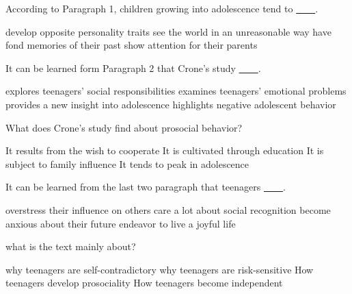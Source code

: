 \item According to Paragraph 1, children growing into adolescence tend to \uline{~~~~}.
\begin{tasks}
	\task develop opposite personality traits
	\task see the world in an unreasonable way
	\task have fond memories of their past
	\task show attention for their parents
\end{tasks}
\item It can be learned form Paragraph 2 that Crone's study \uline{~~~~}.
\begin{tasks}
	\task explores teenagers' social responsibilities
	\task examines teenagers' emotional problems
	\task provides a new insight into adolescence
	\task highlights negative adolescent behavior
\end{tasks}
\item What does Crone's study find about prosocial behavior?
\begin{tasks}
	\task It results from the wish to cooperate
	\task It is cultivated through education
	\task It is subject to family influence
	\task It tends to peak in adolescence
\end{tasks}
\item It can be learned from the last two paragraph that teenagers \uline{~~~~}.
\begin{tasks}
	\task overstress their influence on others
	\task care a lot about social recognition
	\task become anxious about their future
	\task endeavor to live a joyful life
\end{tasks}
\item what is the text mainly about?
\begin{tasks}
	\task why teenagers are self-contradictory
	\task why teenagers are risk-sensitive
	\task How teenagers develop prosociality
	\task How teenagers become independent
\end{tasks}